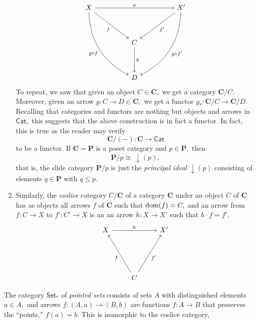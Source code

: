 \begin{enumerate}
\begin{equation*}
		\begin{tikzcd}
X \arrow[rrdd, "f"'] \arrow[rrrr, "a"] \arrow[rrdddd, "g\circ f"', bend right] &%
&&&X' \arrow[lldd, "f'"] \arrow[lldddd, "g\circ f'", bend left] \\
&&&&\\&&C\arrow[dd, "g"] &&\\&&&&\\&&D&&                                                             
\end{tikzcd}
	\end{equation*}
	To repeat, we saw that given an object $C \in \mathbf{C},$ we get a category $\mathbf{C}/C.$ Moreover, given an arrow $g:C\to D\in \mathbf{C},$ we get a functor $g_*:\mathbf{C}/C \to \mathbf{C}/D.$\\
	Recalling that categories and functors are nothing but objects and arrows in $\mathsf{Cat},$ this suggests that the above construction is in fact a functor. In fact, this is true as the reader may verify
	\begin{equation*} 
		\mathbf{C}/(-) : \mathbf{C} \to \mathsf{Cat}
	\end{equation*}
	to be a functor. 
	If $\mathbf{C} = \mathbf{P}$ is a poset category and $p \in \mathbf{P},$ then
	\begin{equation*} 
		\mathbf{P}/p \cong\ {\downarrow}(p),
	\end{equation*}
	that is, the slide category $\mathbf{P}/p$ is just the \emph{principal ideal} ${\downarrow}(p)$ consisting of elements $q \in \mathbf{P}$ with $q \le p.$
	\item Similarly, the \emph{coslice} category $C/\mathbf{C}$ of a category $\mathbf{C}$ under an object $C$ of $\mathbf{C}$ has as objects all arrows $f$ of $\mathbf{C}$ such that $\operatorname{dom}(f) = C,$ and an arrow from $f:C\to X$ to $f':C'\to X$ is an an arrow $h:X\to X'$ such that $h\cdot f = f'.$
	\begin{equation*} 
		\begin{tikzcd}
		X \arrow[rr, "h"] &                                         & X' \\
						  &											&	 \\
		                  &                                         &    \\
		                  &  C \arrow[luuu, "f"] \arrow[ruuu, "f'"']  &   
		\end{tikzcd}
	\end{equation*}
\end{enumerate}
\example{}The category $\mathsf{Set}_*$ of \emph{pointed sets} consists of sets $A$ with distinguished elements $a \in A,$ and arrows $f:(A, a) \to (B, b)$ are functions $f:A\to B$ that preserves the ``points,'' $f(a) = b.$ This is isomorphic to the coslice category,
